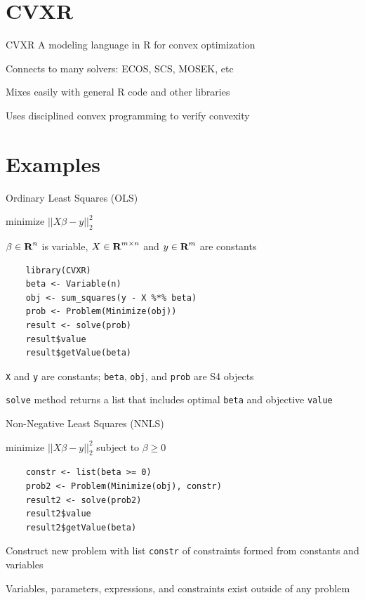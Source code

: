 \documentclass{beamer}
\begin{document}
\section{CVXR}

\begin{frame}{CVXR}
	A modeling language in R for convex optimization
	
	\BIT
		\item Connects to many solvers: ECOS, SCS, MOSEK, etc
		\item Mixes easily with general R code and other libraries
		\item Uses disciplined convex programming to 
		verify convexity
	\EIT
\end{frame}

\section{Examples}

\begin{frame}[fragile]{Ordinary Least Squares (OLS)}
	\BIT
		\item minimize $||X\beta - y||_2^2$
		\item $\beta \in {\mbox{\bf R}}^n$ is variable, $X \in {\mbox{\bf R}}^{m \times n}$ and $y \in {\mbox{\bf R}}^m$ are constants
	\EIT
	
	\pause
	\begin{verbatim}
	library(CVXR)
	beta <- Variable(n)
	obj <- sum_squares(y - X %*% beta)
	prob <- Problem(Minimize(obj))
	result <- solve(prob)
	result$value
	result$getValue(beta)
	\end{verbatim}
	
	\BIT
		\item \verb|X| and \verb|y| are constants; \verb|beta|, \verb|obj|, and \verb|prob| are S4 objects
		\item \verb|solve| method returns a list that includes optimal \verb|beta| and objective \verb|value|
	\EIT
\end{frame}

\begin{frame}[fragile]{Non-Negative Least Squares (NNLS)}
	\BIT
	\item minimize $||X\beta - y||_2^2$ subject to $\beta \geq 0$
	\EIT
	\pause
	\begin{verbatim}
	constr <- list(beta >= 0)
	prob2 <- Problem(Minimize(obj), constr)
	result2 <- solve(prob2)
	result2$value
	result2$getValue(beta)
	\end{verbatim}
	
	\BIT
		\item Construct new problem with list \verb|constr| of constraints formed from constants and variables
		\item Variables, parameters, expressions, and constraints exist outside of any problem
	\EIT
\end{frame}
\end{document}
